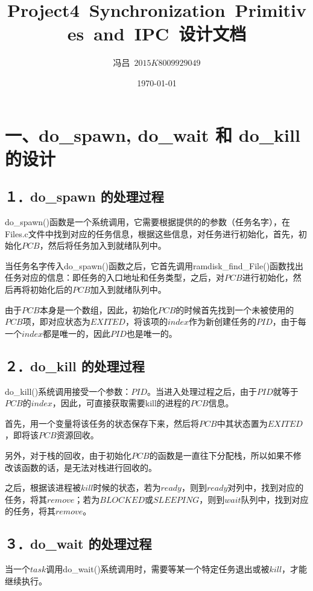 \documentclass[UTF8,noindent]{ctexart}
\title{Project4\ Synchronization\ Primitives\ and\ IPC\ 设计文档}
\author{冯吕\ $2015K8009929049$}
\date{\today}
\begin{document}
\maketitle
{}

\section*{一、do\_spawn, do\_wait 和 do\_kill 的设计}

\subsection*{１．do\_spawn 的处理过程}
do\_spawn()函数是一个系统调用，它需要根据提供的的参数（任务名字），在Files.c文件中找到对应的任务信息，根据这些信息，对任务进行初始化，首先，初始化$PCB$，然后将任务加入到就绪队列中。

当任务名字传入do\_spawn()函数之后，它首先调用ramdisk\_find\_File()函数找出任务对应的信息：即任务的入口地址和任务类型，之后，对$PCB$进行初始化，然后再将初始化后的$PCB$加入到就绪队列中。

由于$PCB$本身是一个数组，因此，初始化$PCB$的时候首先找到一个未被使用的$PCB$项，即对应状态为$EXITED$，将该项的$index$作为新创建任务的$PID$，由于每一个$index$都是唯一的，因此$PID$也是唯一的。

\subsection*{２．do\_kill 的处理过程}

do\_kill()系统调用接受一个参数：$PID$。当进入处理过程之后，由于$PID$就等于$PCB$的$index$，因此，可直接获取需要kill的进程的$PCB$信息。

首先，用一个变量将该任务的状态保存下来，然后将$PCB$中其状态置为$EXITED$，即将该$PCB$资源回收。

另外，对于栈的回收，由于初始化$PCB$的函数是一直往下分配栈，所以如果不修改该函数的话，是无法对栈进行回收的。

之后，根据该进程被$kill$时候的状态，若为$ready$，则到$ready$对列中，找到对应的任务，将其$remove$；若为$BLOCKED$或$SLEEPING$，则到$wait$队列中，找到对应的任务，将其$remove$。

\subsection*{３．do\_wait 的处理过程}
当一个$task$调用do\_wait()系统调用时，需要等某一个特定任务退出或被$kill$，才能继续执行。
\end{document}
